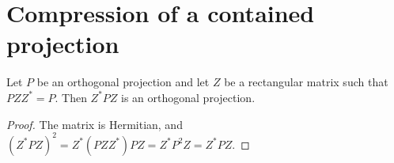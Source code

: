 \section{Compression of a contained projection}
\label{sec:contained_projection_compression}

\begin{theorem}
\label{thm:contained_projection_compression}
\leanok
Let $P$ be an orthogonal projection and let $Z$ be a rectangular matrix
such that $PZZ^*=P$. Then $Z^*PZ$ is an orthogonal projection.
\end{theorem}
\begin{proof}\leanok
The matrix is Hermitian, and
$(Z^*PZ)^2=Z^*(PZZ^*)PZ=Z^*P^2Z=Z^*PZ$.
\end{proof}

